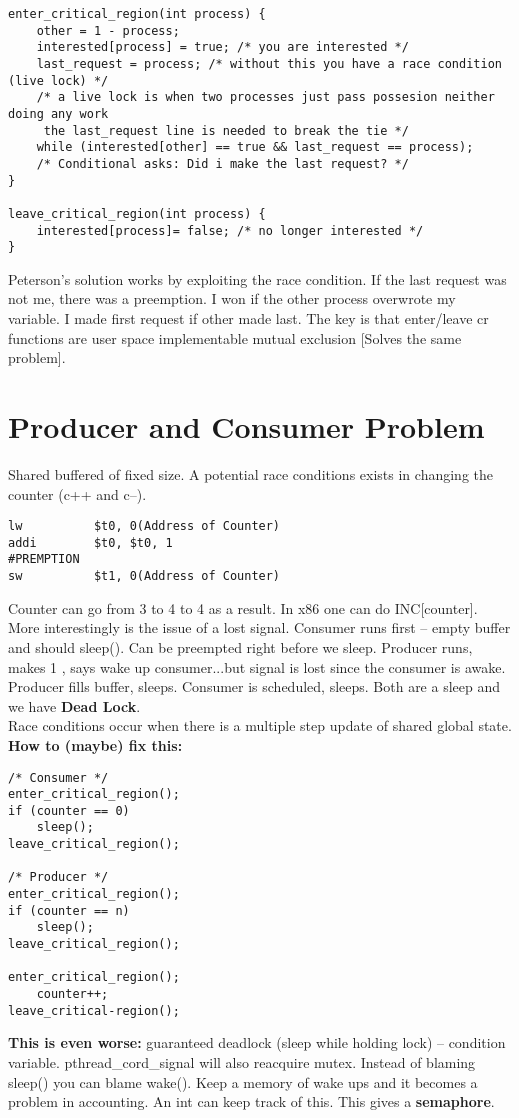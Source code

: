 \documentclass[../base_file/cs1550_notes.tex]{subfiles}
\begin{document}
\begin{lstlisting}
enter_critical_region(int process) {
	other = 1 - process;
	interested[process] = true; /* you are interested */
	last_request = process; /* without this you have a race condition (live lock) */
	/* a live lock is when two processes just pass possesion neither doing any work 
	 the last_request line is needed to break the tie */
	while (interested[other] == true && last_request == process);
	/* Conditional asks: Did i make the last request? */
}

leave_critical_region(int process) {
	interested[process]= false; /* no longer interested */
}
\end{lstlisting}
Peterson's solution works by exploiting the race condition.  If the last request was
not me, there was a preemption.  I won if the other process overwrote my variable. I
made first request if other made last. The key is that enter/leave cr functions are
user space implementable mutual exclusion [Solves the same problem].

\section{Producer and Consumer Problem}
Shared buffered of fixed size.  A potential race conditions exists in changing the 
counter (c++ and c--).
\lstset{language=[mips]Assembler}
\begin{lstlisting}
lw			$t0, 0(Address of Counter)
addi		$t0, $t0, 1
#PREMPTION
sw			$t1, 0(Address of Counter)
\end{lstlisting}	
Counter can go from 3 to 4 to 4 as a result.  In x86 one can do INC[counter]. More
interestingly is the issue of a lost signal.  Consumer runs first -- empty buffer
and should sleep().  Can be preempted right before we sleep.  Producer runs, makes
1 , says wake up consumer...but signal is lost since the consumer is awake.  Producer
fills  buffer, sleeps.  Consumer is scheduled, sleeps.  Both are a sleep and we have
\textbf{Dead Lock}.\\

Race conditions occur when there is a multiple step update of shared global state.\\

\textbf{How to (maybe) fix this:}\\
\lstset{language=C}
\begin{lstlisting}
/* Consumer */
enter_critical_region();
if (counter == 0)
	sleep();
leave_critical_region();

/* Producer */
enter_critical_region();
if (counter == n)
	sleep();
leave_critical_region();

enter_critical_region();
	counter++;
leave_critical-region();
\end{lstlisting}
\textbf{This is even worse:} guaranteed deadlock (sleep while holding lock) -- condition
variable. pthread\_cord\_signal will also reacquire mutex.  Instead of blaming sleep() you
can blame wake().  Keep a memory of wake ups and it becomes a problem in accounting. An
int can keep track of this.  This gives a \textbf{semaphore}.
\end{document}
